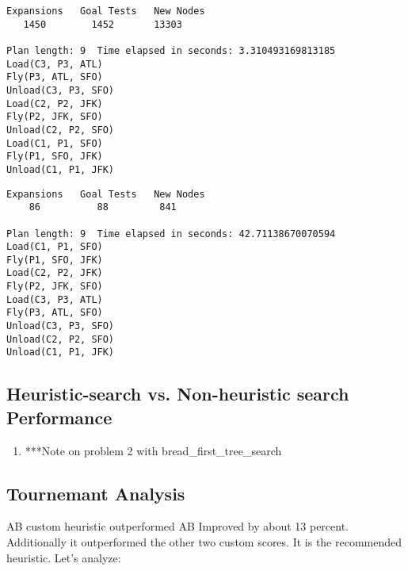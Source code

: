 \documentclass[11pt,a4paper]{report}
\begin{document}
\begin{verbatim}
Expansions   Goal Tests   New Nodes
   1450        1452       13303

Plan length: 9  Time elapsed in seconds: 3.310493169813185
Load(C3, P3, ATL)
Fly(P3, ATL, SFO)
Unload(C3, P3, SFO)
Load(C2, P2, JFK)
Fly(P2, JFK, SFO)
Unload(C2, P2, SFO)
Load(C1, P1, SFO)
Fly(P1, SFO, JFK)
Unload(C1, P1, JFK)
\end{verbatim}
\begin{verbatim}
Expansions   Goal Tests   New Nodes
    86          88         841

Plan length: 9  Time elapsed in seconds: 42.71138670070594
Load(C1, P1, SFO)
Fly(P1, SFO, JFK)
Load(C2, P2, JFK)
Fly(P2, JFK, SFO)
Load(C3, P3, ATL)
Fly(P3, ATL, SFO)
Unload(C3, P3, SFO)
Unload(C2, P2, SFO)
Unload(C1, P1, JFK)
\end{verbatim}

\subsection*{ Heuristic-search vs. Non-heuristic search Performance}

\begin{enumerate}
	\item ***Note on problem 2 with bread_first_tree_search
\end{enumerate}
\subsection*{Tournemant Analysis}
AB custom heuristic outperformed AB Improved by about 13 percent. Additionally it outperformed the other two custom scores. It is the recommended heuristic. Let's analyze:
\end{document}
